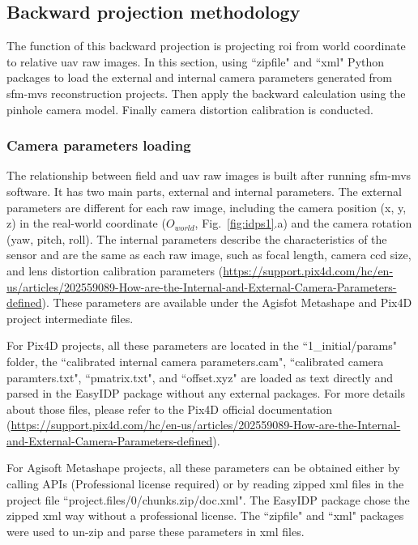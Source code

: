 \subsection{Backward projection methodology}
\label{spp:backward}

% 

The function of this backward projection is projecting \gls{roi} from world coordinate to relative \gls{uav} raw images. In this section, using ``zipfile" and ``xml" Python packages to load the external and internal camera parameters generated from \gls{sfm}-\gls{mvs} reconstruction projects. Then apply the backward calculation using the pinhole camera model. Finally camera distortion calibration is conducted.

\subsubsection{Camera parameters loading}

The relationship between field and \gls{uav} raw images is built after running \gls{sfm}-\gls{mvs} software. It has two main parts, external and internal parameters. The external parameters are different for each raw image, including the camera position (x, y, z) in the real-world coordinate ($O_{world}$, Fig.~\ref{fig:idps1}.a) and the camera rotation (yaw, pitch, roll). The internal parameters describe the characteristics of the sensor and are the same as each raw image, such as focal length, camera \gls{ccd} size, and lens distortion calibration parameters (\url{https://support.pix4d.com/hc/en-us/articles/202559089-How-are-the-Internal-and-External-Camera-Parameters-defined}). These parameters are available under the Agisfot Metashape and Pix4D project intermediate files.

For Pix4D projects, all these parameters are located in the ``1\_initial/params" folder, the ``calibrated internal camera parameters.cam", ``calibrated camera paramters.txt", ``pmatrix.txt", and ``offset.xyz" are loaded as text directly and parsed in the EasyIDP package without any external packages. For more details about those files, please refer to the Pix4D official documentation (\url{https://support.pix4d.com/hc/en-us/articles/202559089-How-are-the-Internal-and-External-Camera-Parameters-defined}).

For Agisoft Metashape projects, all these parameters can be obtained either by calling APIs (Professional license required) or by reading zipped xml files in the project file ``project.files/0/chunks.zip/doc.xml". The EasyIDP package chose the zipped xml way without a professional license. The ``zipfile" and ``xml" packages were used to un-zip and parse these parameters in xml files.

